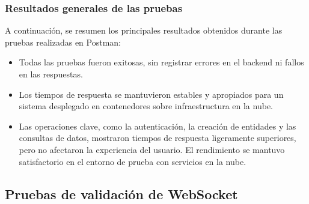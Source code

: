 \subsubsection{Resultados generales de las pruebas}

A continuación, se resumen los principales resultados obtenidos durante las
pruebas realizadas en Postman:

\begin{itemize}
    \item Todas las pruebas fueron exitosas, sin registrar errores en el backend ni
          fallos en las respuestas.
    \item Los tiempos de respuesta se mantuvieron estables y apropiados para un sistema
          desplegado en contenedores sobre infraestructura en la nube.
    \item Las operaciones clave, como la autenticación, la creación de entidades y las
          consultas de datos, mostraron tiempos de respuesta ligeramente superiores, pero
          no afectaron la experiencia del usuario. El rendimiento se mantuvo
          satisfactorio en el entorno de prueba con servicios en la nube.
\end{itemize}

\subsection{Pruebas de validación de WebSocket}




